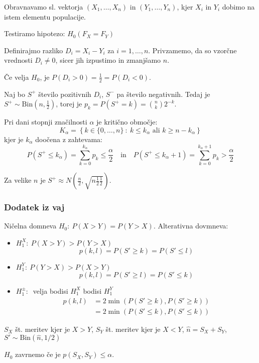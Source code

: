 \begin{multicols}{5}
Obravnavamo sl. vektorja $(X_1, \dots, X_n)$ in $(Y_1, \dots, Y_n)$, kjer $X_i$ in $Y_i$ dobimo na istem elementu populacije.

Testiramo hipotezo: $H_0 (F_X = F_Y)$

Definirajmo razliko $D_i = X_i - Y_i$ za $i = 1,\dots , n$. Privzamemo, da so vzorčne vrednosti $D_i \neq 0$, sicer jih izpustimo in zmanjšamo $n$.

Če velja $H_0$, je $P(D_i > 0) = \frac{1}{2} = P(D_i < 0)$.

Naj bo $S^+$ število pozitivnih $D_i$, $S^-$ pa število negativnih. Tedaj je $S^+ \sim \text{Bin}(n, \frac{1}{2})$, torej je $p_k = P(S^+ = k) = \binom{n}{k}2^{-k}$.

Pri dani stopnji značilnosti $\alpha$ je kritično območje:
\[ K_\alpha = \left\{ k \in \{0, \dots, n\} \ :\ k \leq k_\alpha \text{ ali } k \geq n - k_\alpha \right\}\]
kjer je $k_\alpha$ doočena z zahtevama:
{\small
\[P(S^+ \leq k_\alpha) = \sum_{k=0}^{k_\alpha} p_k \leq \frac{\alpha}{2} \quad \text{in} \quad P(S^+ \leq k_\alpha + 1) = \sum_{k=0}^{k_\alpha + 1} p_k > \frac{\alpha}{2} \]
}

Za velike $n$ je $S^+ \approx N(\frac{n}{2}, \sqrt{n\frac{1}{2}\frac{1}{2}})$.

\subsubsection{Dodatek iz vaj}
Ničelna domneva $H_0:\ P(X > Y) = P(Y > X)$. Alterativna dovmneva:
\begin{itemize}
    \item $H_1^X:\ P(X > Y) > P(Y > X)$ \\
    \[p(k, l) = P(S' \geq k) = P(S' \leq l)\]
    \item $H_1^Y:\ P(Y > X) > P(X > Y)$
    \[p(k, l) = P(S' \geq l) = P(S' \leq k)\]
    \item $H_1^\pm:\ $ velja bodisi $H_1^X$ bodisi $H_1^Y$
    \begin{align*}
        p(k, l) &= 2 \min (P(S' \geq k),  P(S' \geq k)) \\
        & = 2 \min (P(S' \leq k),  P(S' \leq k))
    \end{align*}
\end{itemize}

$S_X$ št. meritev kjer je $X > Y$, $S_Y$ št. meritev kjer je $X < Y$, $\hat{n} = S_X + S_Y$, $S' \sim \text{Bin}(\hat{n}, 1/2)$

$H_0$ zavrnemo če je $p(S_X, S_Y) \leq \alpha$.


\end{multicols}

